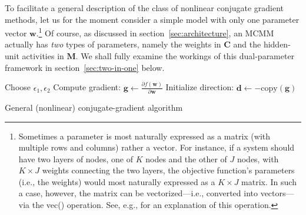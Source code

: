 To facilitate a general description of the class of nonlinear conjugate gradient methods, 
let us for the moment consider a simple model with only one parameter 
vector $\textbf{w}$.\footnote{Sometimes a parameter is most naturally expressed as a matrix (with multiple rows and columns) rather a vector. For instance, if a system should have two layers of nodes, one of $K$ nodes and the other of $J$ nodes, with $K \times J$ weights connecting the two layers, the objective function's parameters (i.e., the weights) would most naturally expressed as a  $K \times J$ matrix. In such a case, however, the matrix can be vectorized---i.e., converted into vectors---via the \textsf{vec()} operation. See, e.g., \citet{fackler:2005} for an explanation of this operation.} %
Of course, as discussed in section~\ref{sec:architecture},
an MCMM actually has \emph{two} types of parameters, namely
the weights in $\textbf{C}$ and the hidden-unit activities in $\textbf{M}$. 
We shall fully examine the workings of this dual-parameter framework in section~\ref{sec:two-in-one} below.
\begin{algorithm}[t]
 Choose $\epsilon_1, \epsilon_2$\;
 Compute gradient: $\textbf{g} \gets \frac{\partial f(\textbf{w})}{\partial \textbf{w}}$\;
Initialize direction: $\textbf{d} \gets -\text{copy}(\textbf{g})$\; \label{line:init-d}
\caption{General (nonlinear) conjugate-gradient algorithm}
\label{alg:gen-cg}
\end{algorithm}
